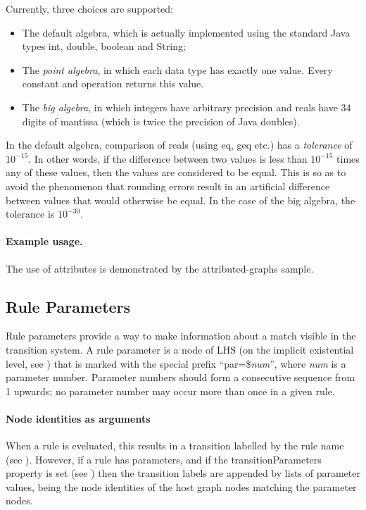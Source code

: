 Currently, three choices are supported:
\begin{itemize}\noitemsep
\item The default algebra, which is actually
implemented using the standard Java types \textsf{int}, \textsf{double},
\textsf{boolean} and \textsf{String};
\item The \emph{point algebra}, in which each data type has exactly one
  value. Every constant and operation returns this value.
\item The \emph{big algebra}, in which integers have arbitrary precision and
  reals have 34 digits of mantissa (which is twice the precision of Java
  \textsf{double}s).
\end{itemize}
%
In the default algebra, comparison of reals (using \textsf{eq}, \textsf{geq}
etc.) has a \emph{tolerance} of $10^{-15}$. In other words, if the difference
between two values is less than $10^{-15}$ times any of these values, then the
values are considered to be equal. This is so as to avoid the phenomenon that
rounding errors result in an artificial difference between values that would
otherwise be equal. In the case of the big algebra, the tolerance is
$10^{-30}$.

\paragraph{Example usage.}

The use of attributes is demonstrated by the \Groove \textsf{attributed-graphs}
sample.

\subsection{Rule Parameters}

Rule parameters provide a way to make information about a match visible in the
transition system. A rule parameter is a node of LHS (on the implicit
existential level, see ) that is marked with the special prefix
``\textsf{par=\${\itshape num}}'', where \textsf{\itshape num} is a parameter
number. Parameter numbers should form a consecutive sequence from 1 upwards; no
parameter number may occur more than once in a given rule.

\paragraph{Node identities as arguments}

When a rule is eveluated, this results in a transition labelled by the rule
name (see ). However, if a rule has parameters, and if the
\textsf{transitionParameters} property is set (see )
then the transition labels are appended by lists of parameter values, being the
node identities of the host graph nodes matching the parameter nodes.

